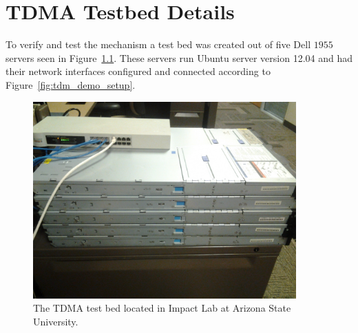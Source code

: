 \documentclass[oneside,12pt]{memoir}
\begin{document}
\chapter{TDMA Testbed Details}
\label{app:tdma_testbed}
To verify and test the mechanism a test bed was created out of five Dell $1955$ servers seen in Figure~\ref{fig:test_bed}. These servers run Ubuntu server version 12.04 and had their network interfaces configured and connected according to Figure~\ref{fig:tdm_demo_setup}.  

\begin{figure}
  \begin{center}
    \includegraphics[width=0.9\textwidth]{test_bed.jpg}
  \end{center}
  \caption{The TDMA test bed located in Impact Lab at Arizona State University.}
\label{fig:test_bed}
\end{figure}



\end{document}
